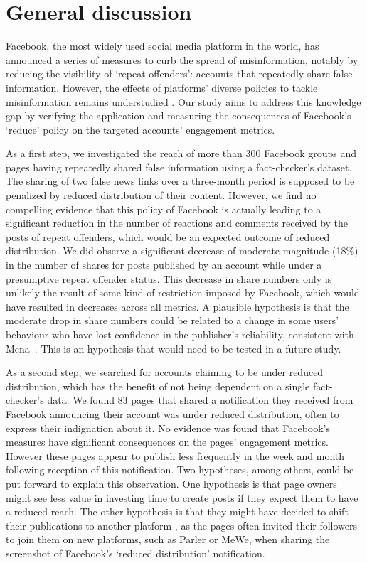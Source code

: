\documentclass[11pt,a4paper]{article}
\begin{document}
\section{General discussion}

Facebook, the most widely used social media platform in the world, has announced a series of measures to curb the spread of misinformation, notably by reducing the visibility of `repeat offenders': accounts that repeatedly share false information. However, the effects of platforms' diverse policies to tackle misinformation remains understudied \citep{pasquetto2020tackling}. 
Our study aims to address this knowledge gap by verifying the application and measuring the consequences of Facebook's `reduce' policy on the targeted accounts' engagement metrics.

As a first step, we investigated the reach of more than 300 Facebook groups and pages having repeatedly shared false information using a fact-checker's dataset. 
The sharing of two false news links over a three-month period is supposed to be penalized by reduced distribution of their content. 
However, we find no compelling evidence that this policy of Facebook is actually leading to a significant reduction in the number of reactions and comments received by the posts of repeat offenders, which would be an expected outcome of reduced distribution. 
We did observe a significant decrease of moderate magnitude (18\%) in the number of shares for posts published by an account while under a presumptive repeat offender status. 
This decrease in share numbers only is unlikely the result of some kind of restriction imposed by Facebook, which would have resulted in decreases across all metrics. 
A plausible hypothesis is that the moderate drop in share numbers could be related to a change in some users’ behaviour who have lost confidence in the publisher’s reliability, consistent with Mena~. 
This is an hypothesis that would need to be tested in a future study. 

As a second step, we searched for accounts claiming to be under reduced distribution, which has the benefit of not being dependent on a single fact-checker’s data. 
We found 83 pages that shared a notification they received from Facebook announcing their account was under reduced distribution, often to express their indignation about it. 
No evidence was found that Facebook’s measures have significant consequences on the pages’ engagement metrics. 
However these pages appear to publish less frequently in the week and month following reception of this notification. 
Two hypotheses, among others, could be put forward to explain this observation. 
One hypothesis is that page owners might see less value in investing time to create posts if they expect them to have a reduced reach. 
The other hypothesis is that they might have decided to shift their publications to another platform \citep{rogers2020deplatforming, rauchfleisch2021deplatforming}, as the pages often invited their followers to join them on new platforms, such as Parler or MeWe, when sharing the screenshot of Facebook's `reduced distribution' notification.
\end{document}
